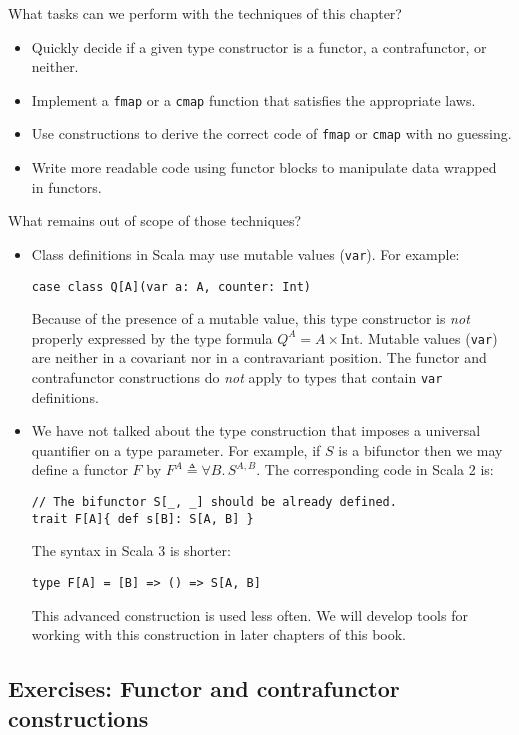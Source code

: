 What tasks can we perform with the techniques of this chapter?
\begin{itemize}
\item Quickly decide if a given type constructor is a functor, a contrafunctor,
or neither.
\item Implement a \lstinline!fmap! or a \lstinline!cmap! function that
satisfies the appropriate laws.
\item Use constructions to derive the correct code of \lstinline!fmap!
or \lstinline!cmap! with no guessing.
\item Write more readable code using functor blocks to manipulate data wrapped
in functors.
\end{itemize}
What remains out of scope of those techniques?
\begin{itemize}
\item Class definitions in Scala may use mutable values (\lstinline!var!).
For example:
\begin{lstlisting}
case class Q[A](var a: A, counter: Int)
\end{lstlisting}
Because of the presence of a mutable value,
this type constructor is \emph{not} properly expressed by the type
formula $Q^{A}=A\times\text{Int}$. Mutable values (\lstinline!var!)
are neither in a covariant nor in a contravariant position. The functor
and contrafunctor constructions do \emph{not} apply to types that
contain \lstinline!var! definitions.
\item We have not talked about the type construction that imposes a universal
quantifier on a type parameter. For example,
if $S$ is a bifunctor then we may define a functor $F$ by $F^{A}\triangleq\forall B.\,S^{A,B}$.
The corresponding code in Scala 2 is:
\begin{lstlisting}
// The bifunctor S[_, _] should be already defined.
trait F[A]{ def s[B]: S[A, B] }
\end{lstlisting}
The syntax in Scala 3 is shorter:
\begin{lstlisting}
type F[A] = [B] => () => S[A, B]
\end{lstlisting}
This advanced construction is used less often. We will develop tools
for working with this construction in later chapters of this book.
\end{itemize}

\subsection{Exercises: Functor and contrafunctor constructions }

